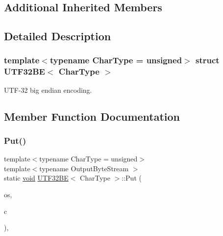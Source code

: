 \subsection*{Additional Inherited Members}


\subsection{Detailed Description}
\subsubsection*{template$<$typename Char\+Type = unsigned$>$\newline
struct U\+T\+F32\+B\+E$<$ Char\+Type $>$}

U\+T\+F-\/32 big endian encoding. 

\subsection{Member Function Documentation}
\mbox{\label{structUTF32BE_ad270b8b016d477f7f7354df535fa28c5}} 
\subsubsection{\texorpdfstring{Put()}{Put()}}
{\footnotesize\ttfamily template$<$typename Char\+Type  = unsigned$>$ \\
template$<$typename Output\+Byte\+Stream $>$ \\
static \hyperlink{imgui__impl__opengl3__loader_8h_ac668e7cffd9e2e9cfee428b9b2f34fa7}{void} \hyperlink{structUTF32BE}{U\+T\+F32\+BE}$<$ Char\+Type $>$\+::Put (\begin{DoxyParamCaption}\item[{Output\+Byte\+Stream \&}]{os,  }\item[{Char\+Type}]{c }\end{DoxyParamCaption})\hspace{0.3cm}{\ttfamily [inline]}, {\ttfamily [static]}}

\mbox{\label{structUTF32BE_a8b1a216dd267ff06a9000cbe593ebd24}} 
